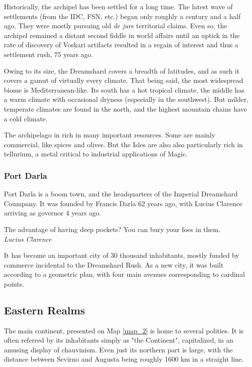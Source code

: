 Historically, the archipel has been settled for a long time. The latest wave of settlements (from the IDC, FSN, etc.) began only roughly a century and a half ago. They were mostly pursuing old \textit{de jure} territorial claims. Even so, the archipel remained a distant second fiddle in world affairs until an uptick in the rate of discovery of Voskari artifacts resulted in a regain of interest and thus a settlement rush, 75 years ago.

Owing to its size, the Dreamshard covers a breadth of latitudes, and as such it covers a gamut of virtually every climate. That being said, the most widespread biome is Mediterranean-like. Its south has a hot tropical climate, the middle has a warm climate with occasional dryness (especially in the southwest). But milder, temperate climates are found in the north, and the highest mountain chains have a cold climate.

The archipelago in rich in many important resources. Some are mainly commercial, like spices and olives. But the Isles are also also particularly rich in tellurium, a metal critical to industrial applications of Magic.



\subsubsection{Port Darla}

Port Darla is a boom town, and the headquarters of the Imperial Dreamshard Coumpany. It was founded by Francis Darla 62 years ago, with Lucius Clarence arriving as governor 4 years ago. 



\begin{rpg-quotebox}
    The advantage of having deep pockets? You can bury your foes in them. \\ \textendash \textit{Lucius Clarence}
    \end{rpg-quotebox}
    

It has become an important city of 30 thousand inhabitants, mostly funded by commerce incidental to the Dreamshard Rush. As a new city, it was built according to a geometric plan, with four main avenues corresponding to cardinal points.


\subsection{Eastern Realms}

The main continent, presented on Map \ref{map_2} is home to several polities. It is often referred by its inhabitants simply as "the Continent", capitalized, in an amusing display of chauvinism. Even just its northern part is large, with the distance between Sevirno and Augusta being roughly 1600 km in a straight line.

